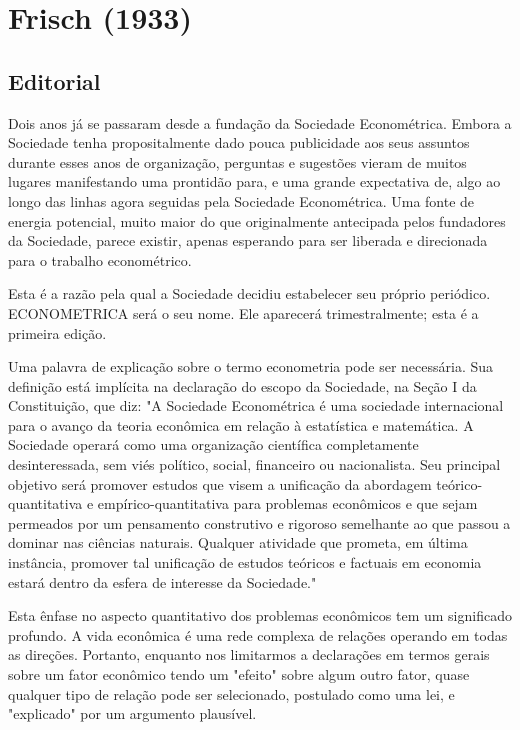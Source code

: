 \documentclass[12pt]{article}
\begin{document}
\section{\textbf{Frisch (1933)}}

\subsection{\textbf{Editorial}}
Dois anos já se passaram desde a fundação da Sociedade Econométrica. Embora a Sociedade tenha propositalmente dado pouca publicidade aos seus assuntos durante esses anos de organização, perguntas e sugestões vieram de muitos lugares manifestando uma prontidão para, e uma grande expectativa de, algo ao longo das linhas agora seguidas pela Sociedade Econométrica. Uma fonte de energia potencial, muito maior do que originalmente antecipada pelos fundadores da Sociedade, parece existir, apenas esperando para ser liberada e direcionada para o trabalho econométrico.

Esta é a razão pela qual a Sociedade decidiu estabelecer seu próprio periódico. ECONOMETRICA será o seu nome. Ele aparecerá trimestralmente; esta é a primeira edição.

Uma palavra de explicação sobre o termo econometria pode ser necessária. Sua definição está implícita na declaração do escopo da Sociedade, na Seção I da Constituição, que diz: "A Sociedade Econométrica é uma sociedade internacional para o avanço da teoria econômica em relação à estatística e matemática. A Sociedade operará como uma organização científica completamente desinteressada, sem viés político, social, financeiro ou nacionalista. Seu principal objetivo será promover estudos que visem a unificação da abordagem teórico-quantitativa e empírico-quantitativa para problemas econômicos e que sejam permeados por um pensamento construtivo e rigoroso semelhante ao que passou a dominar nas ciências naturais. Qualquer atividade que prometa, em última instância, promover tal unificação de estudos teóricos e factuais em economia estará dentro da esfera de interesse da Sociedade."

Esta ênfase no aspecto quantitativo dos problemas econômicos tem um significado profundo. A vida econômica é uma rede complexa de relações operando em todas as direções. Portanto, enquanto nos limitarmos a declarações em termos gerais sobre um fator econômico tendo um "efeito" sobre algum outro fator, quase qualquer tipo de relação pode ser selecionado, postulado como uma lei, e "explicado" por um argumento plausível.
\end{document}
